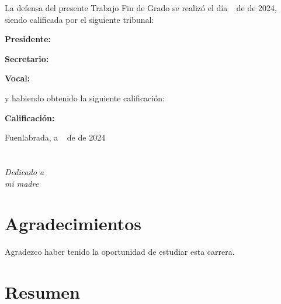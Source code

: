 \documentclass[a4paper, 12pt]{book}
\begin{document}
\vspace{1cm}
La defensa del presente Trabajo Fin de Grado se realizó el día \qquad$\;\,$ de \qquad\qquad\qquad\qquad \newline de 2024, siendo calificada por el siguiente tribunal:


\vspace{0.5cm}
\textbf{Presidente:}

\vspace{1.2cm}
\textbf{Secretario:}

\vspace{1.2cm}
\textbf{Vocal:}


\vspace{1.2cm}
y habiendo obtenido la siguiente calificación:

\vspace{1cm}
\textbf{Calificación:}


\vspace{1cm}
\begin{flushright}
Fuenlabrada, a \qquad$\;\,$ de \qquad\qquad\qquad\qquad de 2024
\end{flushright}


\chapter*{}
\begin{flushright}
\textit{Dedicado a \\
mi madre}
\end{flushright}


\chapter*{Agradecimientos}

Agradezco haber tenido la oportunidad de estudiar esta carrera. 


\chapter*{Resumen}
\end{document}
